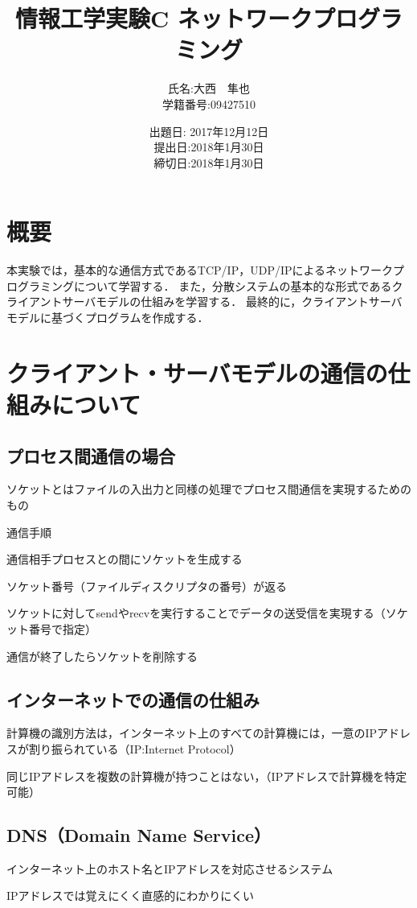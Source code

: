 \documentclass[a4j]{jarticle}
\title{情報工学実験C ネットワークプログラミング}
\author{氏名:大西　隼也 \\学籍番号:09427510}
\date{出題日: 2017年12月12日\\提出日:2018年1月30日 \\締切日:2018年1月30日}
\begin{document}
\maketitle

\section{概要}
本実験では，基本的な通信方式であるTCP/IP，UDP/IPによるネットワークプログラミングについて学習する．
また，分散システムの基本的な形式であるクライアントサーバモデルの仕組みを学習する．
最終的に，クライアントサーバモデルに基づくプログラムを作成する．

\section{クライアント・サーバモデルの通信の仕組みについて}

\subsection{プロセス間通信の場合}

ソケットとはファイルの入出力と同様の処理でプロセス間通信を実現するためのもの

通信手順

通信相手プロセスとの間にソケットを生成する

ソケット番号（ファイルディスクリプタの番号）が返る

ソケットに対してsendやrecvを実行することでデータの送受信を実現する（ソケット番号で指定）

通信が終了したらソケットを削除する

\subsection{インターネットでの通信の仕組み}

計算機の識別方法は，インターネット上のすべての計算機には，一意のIPアドレスが割り振られている（IP:Internet Protocol）

同じIPアドレスを複数の計算機が持つことはない，（IPアドレスで計算機を特定可能）

\subsection{DNS（Domain Name Service）}

インターネット上のホスト名とIPアドレスを対応させるシステム

IPアドレスでは覚えにくく直感的にわかりにくい
\end{document}
